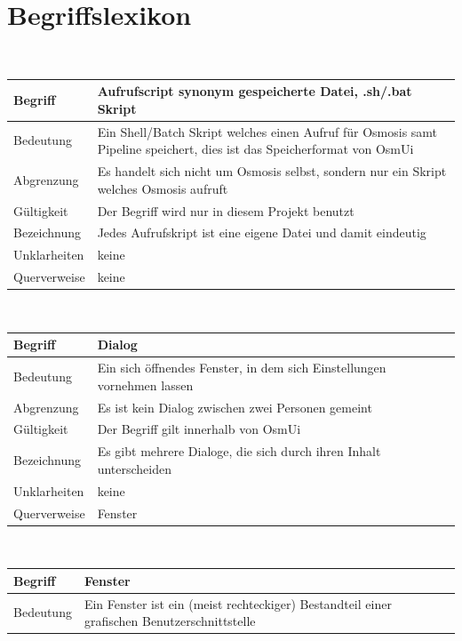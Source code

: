 \documentclass[a4paper,12pt]{scrartcl}
\begin{document}
\section{Begriffslexikon}
\begin{center}
\ \\
\begin{tabular}{|p{5cm}|p{10cm}|}
\hline Begriff & \textbf{Aufrufscript} synonym gespeicherte Datei, .sh/.bat Skript\\ 
\hline Bedeutung & Ein Shell/Batch Skript welches einen Aufruf für Osmosis samt Pipeline speichert,
\newline dies ist das Speicherformat von OsmUi \\ 
\hline Abgrenzung & Es handelt sich nicht um Osmosis selbst, sondern nur ein Skript welches Osmosis aufruft \\ 
\hline Gültigkeit &  Der Begriff wird nur in diesem Projekt benutzt\\ 
\hline Bezeichnung &  Jedes Aufrufskript ist eine eigene Datei und damit eindeutig\\ 
\hline Unklarheiten &  keine \\ 
\hline Querverweise &  keine \\ 
\hline 
\end{tabular}
\vspace{0.7cm}
\\
\begin{tabular}{|p{5cm}|p{10cm}|}
\hline Begriff & \textbf{Dialog}\\ 
\hline Bedeutung & Ein sich öffnendes Fenster, in dem sich Einstellungen vornehmen lassen \\ 
\hline Abgrenzung & Es ist kein Dialog zwischen zwei Personen gemeint\\ 
\hline Gültigkeit & Der Begriff gilt innerhalb von OsmUi \\ 
\hline Bezeichnung & Es gibt mehrere Dialoge, die sich durch ihren Inhalt unterscheiden \\ 
\hline Unklarheiten & keine \\ 
\hline Querverweise & Fenster \\ 
\hline
\end{tabular}
\vspace{0.7cm}
\\
\begin{tabular}{|p{5cm}|p{10cm}|}
\hline Begriff & \textbf{Fenster}\\ 
\hline Bedeutung & Ein Fenster ist ein (meist rechteckiger) Bestandteil einer grafischen Benutzerschnittstelle \\ 

\end{tabular}
\end{center}
\end{document}
